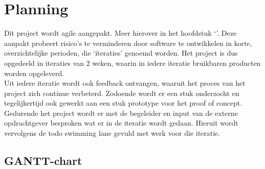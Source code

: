 
\chapter{Planning}
Dit project wordt agile aangepakt. Meer hierover in het hoofdstuk ‘’. Deze aanpakt probeert risico's te verminderen door software te ontwikkelen in korte, overzichtelijke perioden, die ‘iteraties’ genoemd worden. Het project is dus opgedeeld in iteraties van 2 weken, waarin in iedere iteratie bruikbaren producten worden opgeleverd.\\

Uit iedere iteratie wordt ook feedback ontvangen, waaruit het proces van het project zich continue verbeterd. Zodoende wordt er een stuk onderzocht en tegelijkertijd ook gewerkt aan een stuk prototype voor het proof of concept. Gedurende het project wordt er met de begeleider en input van de externe opdrachtgever besproken wat er in de iteratie wordt gedaan. Hieruit wordt vervolgens de todo swimming lane gevuld met werk voor die iteratie.

\section{GANTT-chart}


